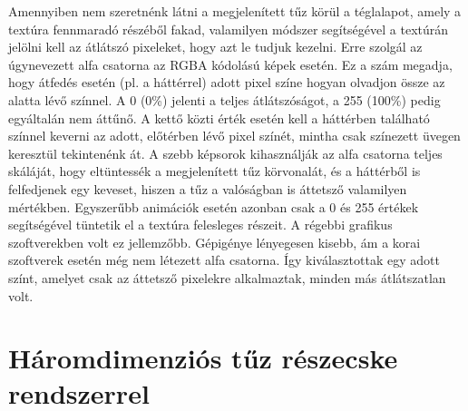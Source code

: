 Amennyiben nem szeretnénk látni a megjelenített tűz körül a téglalapot, amely a textúra fennmaradó részéből fakad, valamilyen módszer segítségével a textúrán jelölni kell az átlátszó pixeleket, hogy azt le tudjuk kezelni. Erre szolgál az úgynevezett alfa csatorna az RGBA kódolású képek esetén. Ez a szám megadja, hogy átfedés esetén (pl. a háttérrel) adott pixel színe hogyan olvadjon össze az alatta lévő színnel.  A 0 (0\%) jelenti a teljes átlátszóságot, a 255 (100\%) pedig egyáltalán nem áttűnő. A kettő közti érték esetén kell a háttérben található színnel keverni az adott, előtérben lévő pixel színét, mintha csak színezett üvegen keresztül tekintenénk át. A szebb képsorok kihasználják az alfa csatorna teljes skáláját, hogy eltüntessék a megjelenített tűz körvonalát, és a háttérből is felfedjenek egy keveset, hiszen a tűz a valóságban is áttetsző valamilyen mértékben. Egyszerűbb animációk esetén azonban csak a 0 és 255 értékek segítségével tüntetik el a textúra felesleges részeit. A régebbi grafikus szoftverekben volt ez jellemzőbb. Gépigénye lényegesen kisebb, ám a korai szoftverek esetén még nem létezett alfa csatorna. Így kiválasztottak egy adott színt, amelyet csak az áttetsző pixelekre alkalmaztak, minden más átlátszatlan volt.




\section{Háromdimenziós tűz részecske rendszerrel}

















